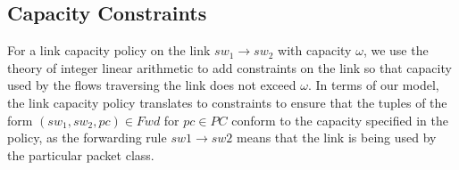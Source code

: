 
\subsection{Capacity Constraints}
For a link capacity policy on the link $sw_1 \rightarrow sw_2$ with capacity $\omega$, we use the theory of integer linear arithmetic to add constraints on the link so that capacity used by the flows traversing the link does not exceed $\omega$. In terms of our model, the link capacity policy translates to constraints to ensure that the tuples of the form $(sw_1, sw_2, pc) \in Fwd$ for $pc \in PC$ conform to the capacity specified in the policy, as the forwarding rule $sw1 \rightarrow sw2$ means that the link is being used by the particular packet class.
 
